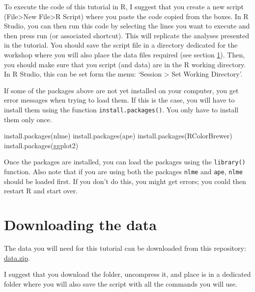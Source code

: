 \documentclass[
]{book}
\newenvironment{Shaded}{\begin{snugshade}}{\end{snugshade}}
\newcommand{\FunctionTok}[1]{\textcolor[rgb]{0.00,0.00,0.00}{#1}}
\newcommand{\NormalTok}[1]{#1}
\newcommand{\StringTok}[1]{\textcolor[rgb]{0.31,0.60,0.02}{#1}}
\begin{document}
To execute the code of this tutorial in R, I suggest that you create a new script (File\textgreater New File\textgreater R Script) where you paste the code copied from the boxes. In R Studio, you can then run this code by selecting the lines you want to execute and then press run (or associated shortcut). This will replicate the analyses presented in the tutorial. You should save the script file in a directory dedicated for the workshop where you will also place the data files required (see section \ref{download}). Then, you should make sure that you script (and data) are in the R working directory. In R Studio, this can be set form the menu: `Session \textgreater{} Set Working Directory'.

If some of the packages above are not yet installed on your computer, you get error messages when trying to load them. If this is the case, you will have to install them using the function \texttt{install.packages()}. You only have to install them only once.

\begin{Shaded}
\begin{Highlighting}[]
\FunctionTok{install.packages}\NormalTok{(}\StringTok{\textquotesingle{}nlme\textquotesingle{}}\NormalTok{)}
\FunctionTok{install.packages}\NormalTok{(}\StringTok{\textquotesingle{}ape\textquotesingle{}}\NormalTok{)}
\FunctionTok{install.packages}\NormalTok{(}\StringTok{\textquotesingle{}RColorBrewer\textquotesingle{}}\NormalTok{)}
\FunctionTok{install.packages}\NormalTok{(}\StringTok{\textquotesingle{}ggplot2\textquotesingle{}}\NormalTok{)}
\end{Highlighting}
\end{Shaded}

Once the packages are installed, you can load the packages using the \texttt{library()} function. Also note that if you are using both the packages \texttt{nlme} and \texttt{ape}, \texttt{nlme} should be loaded first. If you don't do this, you might get errors; you could then restart R and start over.

\hypertarget{download}{%
\section{Downloading the data}\label{download}}

The data you will need for this tutorial can be downloaded from this repository: \href{https://simjoly.github.io/ComparativeMethods-HalfDayWorkshop/data.zip}{data.zip}.

I suggest that you download the folder, uncompress it, and place is in a dedicated folder where you will also save the script with all the commands you will use.
\end{document}
